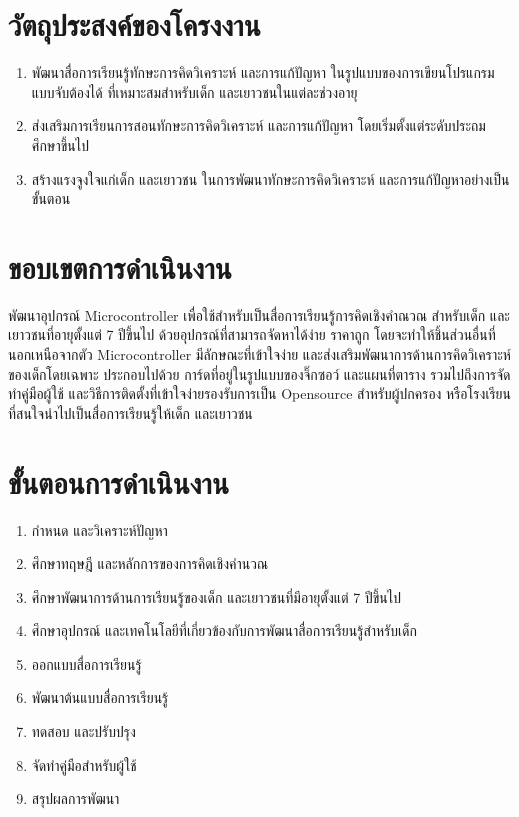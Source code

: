 \section{วัตถุประสงค์ของโครงงาน}
\begin{enumerate}
    \item พัฒนาสื่อการเรียนรู้ทักษะการคิดวิเคราะห์ และการแก้ปัญหา ในรูปแบบของการเขียนโปรแกรมแบบจับต้องได้ ที่เหมาะสมสำหรับเด็ก และเยาวชนในแต่ละช่วงอายุ
    \item ส่งเสริมการเรียนการสอนทักษะการคิดวิเคราะห์ และการแก้ปัญหา โดยเริ่มตั้งแต่ระดับประถมศึกษาขึ้นไป 
    \item สร้างแรงจูงใจแก่เด็ก และเยาวชน ในการพัฒนาทักษะการคิดวิเคราะห์ และการแก้ปัญหาอย่างเป็นขั้นตอน
\end{enumerate}

\section{ขอบเขตการดำเนินงาน}
พัฒนาอุปกรณ์ Microcontroller เพื่อใช้สำหรับเป็นสื่อการเรียนรู้การคิดเชิงคำณวณ สำหรับเด็ก และเยาวชนที่อายุตั้งแต่ 7 ปีขึ้นไป ด้วยอุปกรณ์ที่สามารถจัดหาได้ง่าย ราคาถูก
โดยจะทำให้ชิ้นส่วนอื่นที่นอกเหนือจากตัว Microcontroller มีลักษณะที่เข้าใจง่าย และส่งเสริมพัฒนาการด้านการคิดวิเคราะห์ของเด็กโดยเฉพาะ ประกอบไปด้วย
การ์ดที่อยู่ในรูปแบบของจิ๊กซอว์ และแผนที่ตาราง รวมไปถึงการจัดทำคู่มือผู้ใช้ และวิธีการติดตั้งที่เข้าใจง่ายรองรับการเป็น Opensource สำหรับผู้ปกครอง หรือโรงเรียนที่สนใจนำไปเป็นสื่อการเรียนรู้ให้เด็ก และเยาวชน

\section{ขั้นตอนการดำเนินงาน}
\begin{enumerate}
    \item กำหนด และวิเคราะห์ปัญหา
    \item ศึกษาทฤษฎี และหลักการของการคิดเชิงคำนวณ
    \item ศึกษาพัฒนาการด้านการเรียนรู้ของเด็ก และเยาวชนที่มีอายุตั้งแต่ 7 ปีขึ้นไป
    \item ศึกษาอุปกรณ์ และเทคโนโลยีที่เกี่ยวข้องกับการพัฒนาสื่อการเรียนรู้สำหรับเด็ก
    \item ออกแบบสื่อการเรียนรู้
    \item พัฒนาต้นแบบสื่อการเรียนรู้
    \item ทดสอบ และปรับปรุง
    \item จัดทำคู่มือสำหรับผู้ใช้
    \item สรุปผลการพัฒนา
    
\end{enumerate}

